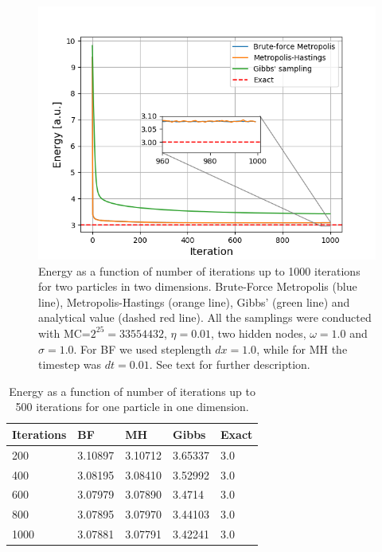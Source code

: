 \documentclass[norsk,a4paper,12pt]{article}
\begin{document}
 \begin{figure} [H]
 	\centering
 	\includegraphics[scale=0.8]{plots/comparison_energy_2P.png}
 	\caption{Energy as a function of number of iterations up to 1000 iterations for two particles in two dimensions. Brute-Force Metropolis (blue line), Metropolis-Hastings (orange line), Gibbs' (green line) and analytical value (dashed red line). All the samplings were conducted with MC=$2^{25}=33 554 432$, $\eta=0.01$, two hidden nodes, $\omega=1.0$ and $\sigma=1.0$. For BF we used steplength $dx=1.0$, while for MH the timestep was $dt=0.01$. See text for further description.}
 	\label{fig:energy2P2D}
 \end{figure}

\begin{table} [H]
	\caption{Energy as a function of number of iterations up to 500 iterations for one particle in one dimension. \vspace{2mm}}
	\begin{tabularx}{\textwidth}{X|XXXX} \hline\hline
		\label{tab:energies2P2D}
		Iterations & BF & MH & Gibbs & Exact \\ \hline
				200 & 3.10897 & 3.10712 & 3.65337 & 3.0 \\
				400 & 3.08195 & 3.08410 & 3.52992 & 3.0 \\
				600 & 3.07979 & 3.07890 & 3.4714 & 3.0 \\
				800 & 3.07895 & 3.07970 & 3.44103 & 3.0 \\
				1000 & 3.07881 & 3.07791 & 3.42241 & 3.0 \\ \hline
	\end{tabularx}
\end{table}
\end{document}
